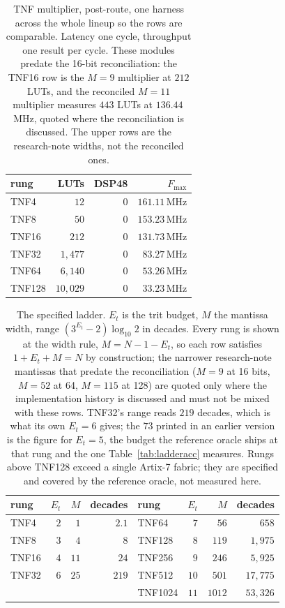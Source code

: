 \documentclass[11pt]{article}
\theoremstyle{definition}
\begin{document}
\begin{table}[t]\centering
\caption{TNF multiplier, post-route, one harness across the whole lineup so the
rows are comparable. Latency one cycle, throughput one result per cycle. These
modules predate the 16-bit reconciliation: the TNF16 row is the $M = 9$ multiplier
at $212$ LUTs, and the reconciled $M = 11$ multiplier measures $443$ LUTs at
$136.44$\,MHz, quoted where the reconciliation is discussed. The upper rows are the
research-note widths, not the reconciled ones.}
\label{tab:ladder}
\begin{tabular}{lrrr}
\toprule
rung & LUTs & DSP48 & $F_{\max}$ \\
\midrule
TNF4  & $12$      & $0$ & $161.11$\,MHz \\
TNF8  & $50$      & $0$ & $153.23$\,MHz \\
TNF16 & $212$     & $0$ & $131.73$\,MHz \\
TNF32  & $1{,}477$  & $0$ & $83.27$\,MHz \\
TNF64  & $6{,}140$  & $0$ & $53.26$\,MHz \\
TNF128 & $10{,}029$ & $0$ & $33.23$\,MHz \\
\bottomrule
\end{tabular}
\end{table}

\begin{table}[t]\centering
\caption{The specified ladder. $E_t$ is the trit budget, $M$ the mantissa width,
range $(3^{E_t}-2)\log_{10}2$ in decades. Every rung is shown at the width
rule, $M = N-1-E_t$, so each row satisfies $1+E_t+M=N$ by construction; the
narrower research-note mantissas that predate the reconciliation ($M=9$ at 16
bits, $M=52$ at 64, $M=115$ at 128) are quoted only where the implementation
history is discussed and must not be mixed with these rows. TNF32's range reads $219$ decades, which is what its own
$E_t = 6$ gives; the $73$ printed in an earlier version is the figure for
$E_t = 5$, the budget the reference oracle ships at that rung and the one
Table~\ref{tab:ladderacc} measures. Rungs above TNF128 exceed a single Artix-7
fabric; they are specified and covered by the reference oracle, not measured
here.}
\label{tab:spec}
\begin{tabular}{lrrr@{\hskip 2em}lrrr}
\toprule
rung & $E_t$ & $M$ & decades & rung & $E_t$ & $M$ & decades \\
\midrule
TNF4  & $2$ & $1$  & $2.1$ & TNF64   & $7$  & $56$   & $658$ \\
TNF8  & $3$ & $4$  & $8$   & TNF128  & $8$  & $119$  & $1{,}975$ \\
TNF16 & $4$ & $11$ & $24$  & TNF256  & $9$  & $246$  & $5{,}925$ \\
TNF32 & $6$ & $25$ & $219$ & TNF512  & $10$ & $501$  & $17{,}775$ \\
       &     &      &       & TNF1024 & $11$ & $1012$ & $53{,}326$ \\
\bottomrule
\end{tabular}
\end{table}
\end{document}
